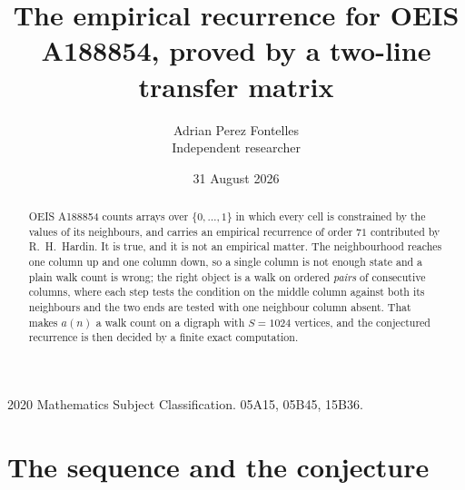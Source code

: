\documentclass[11pt,a4paper]{article}
\title{The empirical recurrence for OEIS A188854, proved by a two-line transfer matrix}
\author{Adrian Perez Fontelles\\ \small Independent researcher}
\date{31 August 2026}
\theoremstyle{plain}
\theoremstyle{definition}
\begin{document}
\maketitle

\begin{abstract}
OEIS A188854 counts arrays over $\{0,\dots,1\}$ in which every cell is constrained by the
values of its neighbours, and carries an empirical recurrence of order $71$ contributed
by R.~H.~Hardin. It is true, and it is not an empirical matter. The neighbourhood reaches one
column up and one column down, so a single column is not enough state and a plain walk count
is wrong; the right object is a walk on ordered \emph{pairs} of consecutive columns, where
each step tests the condition on the middle column against both its neighbours and the two
ends are tested with one neighbour column absent. That makes $a(n)$ a walk count on a digraph
with $S=1024$ vertices, and the conjectured recurrence is then decided by a finite exact
computation.
\end{abstract}

\noindent\small 2020 Mathematics Subject Classification. 05A15, 05B45, 15B36.\normalsize

\section{The sequence and the conjecture}
\end{document}
